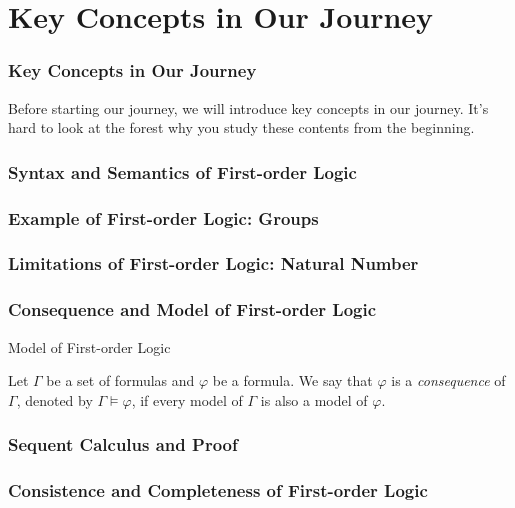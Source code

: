 \section{Key Concepts in Our Journey}

\begin{frame}
    \frametitle{Key Concepts in Our Journey}

    Before starting our journey, we will introduce key concepts in our journey.
    It's hard to look at the forest why you study these contents from the beginning.
    
\end{frame}

\begin{frame}
    \frametitle{Syntax and Semantics of First-order Logic}


\end{frame}

\begin{frame}
    \frametitle{Example of First-order Logic: Groups}

\end{frame}

\begin{frame}
    \frametitle{Limitations of First-order Logic: Natural Number}
\end{frame}

\begin{frame}
    \frametitle{Consequence and Model of First-order Logic}

    \begin{definition}
        Model of First-order Logic
        
    \end{definition}
    \begin{definition}
        Let $\Gamma$ be a set of formulas and $\varphi$ be a formula.
        We say that $\varphi$ is a \textit{consequence} of $\Gamma$, denoted by $\Gamma \models \varphi$, if every model of $\Gamma$ is also a model of $\varphi$.
    \end{definition}
\end{frame}

\begin{frame}
    \frametitle{Sequent Calculus and Proof} 
\end{frame}

\begin{frame}
    \frametitle{Consistence and Completeness of First-order Logic}
\end{frame}